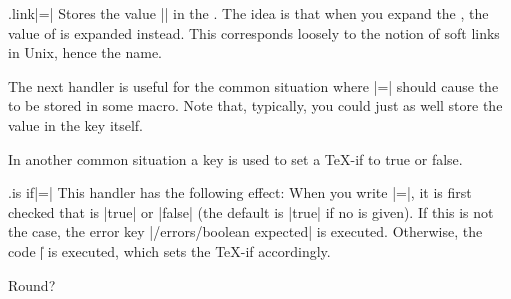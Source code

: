 \begin{handler}{{.link}|=|}
  Stores the value || in the
  . The idea is that when you expand the , the
  value of  is expanded instead. This corresponds
  loosely to the notion of soft links in Unix, hence the name.
\end{handler}

The next handler is useful for the common situation where
|=| should cause the  to be stored
in some macro. Note that, typically, you could just as well store the
value in the key itself.



In another common situation a key is used to set a \TeX-if to true or
false.

\begin{handler}{{.is if}|=|}
  This handler has the following effect: When you write
  |=|, it is first checked that  is
  |true| or |false| (the default is |true| if no  is
  given). If this is not the case, the error key
  |/errors/boolean expected| is executed. Otherwise,
  the code |\| is executed, which sets
  the \TeX-if accordingly.
\begin{codeexample}[]
\newif\iftheworldisflat
{}
\iftheworldisflat
  Flat
\else
  Round?
\fi
\end{codeexample}
\end{handler}

